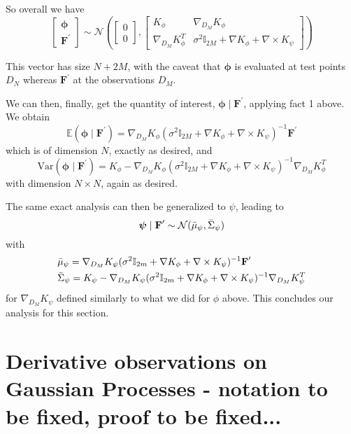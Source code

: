 \documentclass[11pt,a4paper]{article}
\begin{document}
So overall we have
$$
\begin{bmatrix}
\bm{\phi} \\ \textbf{F}^\prime 
\end{bmatrix}
\sim \mathcal{N}\left( 
\begin{bmatrix}
0 \\ 0 
\end{bmatrix}, 
\begin{bmatrix}
K_{\phi} & \nabla_{D_M} K_{\phi} \\
\nabla_{D_M} K_{\phi}^T & \sigma^2 \mathbb{I}_{2M} + \nabla K_{\phi} + \nabla \times K_{\psi}
\end{bmatrix}
\right)
$$

This vector has size $N + 2M$, with the caveat that $\bm{\phi}$ is evaluated at test points $D_N$ whereas $\textbf{F}^\prime$ at the observations $D_M$. \newline

We can then, finally, get the quantity of interest, $\bm{\phi} \mid \textbf{F}^\prime$, applying fact 1 above. We obtain 
$$
\mathbb{E}(\bm{\phi} \mid \textbf{F}^\prime) = \nabla_{D_M} K_{\phi} (\sigma^2 \mathbb{I}_{2M} + \nabla K_{\phi} + \nabla \times K_{\psi})^{-1} \textbf{F}^\prime
$$
which is of dimension $N$, exactly as desired, and 
$$
\text{Var}(\bm{\phi} \mid \textbf{F}^\prime) = K_{\phi} - \nabla_{D_M} K_{\phi} (\sigma^2 \mathbb{I}_{2M} + \nabla K_{\phi} + \nabla \times K_{\psi})^{-1} \nabla_{D_M} K_{\phi}^T
$$
with dimension $N \times N$, again as desired. \newline

The same exact analysis can then be generalized to $\psi$, leading to 
$$
    \bm{\psi} \mid \textbf{F}^\prime \sim \mathcal{N}(\Bar{\mu}_{\psi}, \Bar{\Sigma}_{\psi})
$$
with 
\begin{align*}
    &\Bar{\mu}_{\psi} = \nabla_{D_M} K_{\psi} (\sigma^2 \mathbb{I}_{2m} + \nabla K_{\phi} + \nabla \times K_{\psi})^{-1} 
    \textbf{F}^\prime \\
    &\Bar{\Sigma}_{\psi} = K_{\psi} - \nabla_{D_M} K_{\psi} (\sigma^2 \mathbb{I}_{2m} + \nabla K_{\phi} + \nabla \times K_{\psi})^{-1} \nabla_{D_M} K_{\psi}^T
\end{align*}
for $\nabla_{D_M} K_{\psi}$ defined similarly to what we did for $\phi$ above. This concludes our analysis for this section. \newline

\newpage

\section*{Derivative observations on Gaussian Processes - notation to be fixed, proof to be fixed...}
\end{document}
